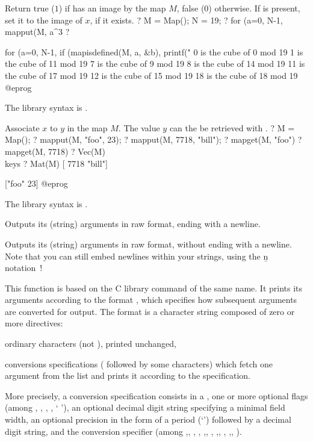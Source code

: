 \label{se:mapisdefined}
Return true ($1$) if  has an image by the map $M$, false ($0$)
otherwise. If  is present, set it to the image of $x$, if it exists.
\bprog
? M = Map(); N = 19;
? for (a=0, N-1, mapput(M, a^3%
? {for (a=0, N-1,
     if (mapisdefined(M, a, &b),
       printf("%
0 is the cube of 0 mod 19
1 is the cube of 11 mod 19
7 is the cube of 9 mod 19
8 is the cube of 14 mod 19
11 is the cube of 17 mod 19
12 is the cube of 15 mod 19
18 is the cube of 18 mod 19
@eprog

The library syntax is .

\label{se:mapput}
Associate $x$ to $y$ in the map $M$. The value $y$ can the be retrieved
with .
\bprog
? M = Map();
? mapput(M, "foo", 23);
? mapput(M, 7718, "bill");
? mapget(M, "foo")
? mapget(M, 7718)
? Vec(M)  \\ keys
? Mat(M)
[ 7718 "bill"]

["foo"     23]
@eprog

The library syntax is .

\label{se:print}
Outputs its (string) arguments in raw format, ending with a newline.

\label{se:print1}
Outputs its (string) arguments in raw
format, without ending with a newline. Note that you can still embed newlines
within your strings, using the \b{n} notation~!

\label{se:printf}
This function is based on the C library command of the same name.
It prints its arguments according to the format , which specifies how
subsequent arguments are converted for output. The format is a
character string composed of zero or more directives:

\item ordinary characters (not \kbd{\%}), printed unchanged,

\item conversions specifications (\kbd{\%} followed by some characters)
which fetch one argument from the list and prints it according to the
specification.

More precisely, a conversion specification consists in a \kbd{\%}, one or more
optional flags (among \kbd{\#}, , \kbd{-}, \kbd{+}, ` '), an optional
decimal digit string specifying a minimal field width, an optional precision
in the form of a period (`') followed by a decimal digit string, and
the conversion specifier (among ,, , ,
,, , ,, , ,, ).

}
